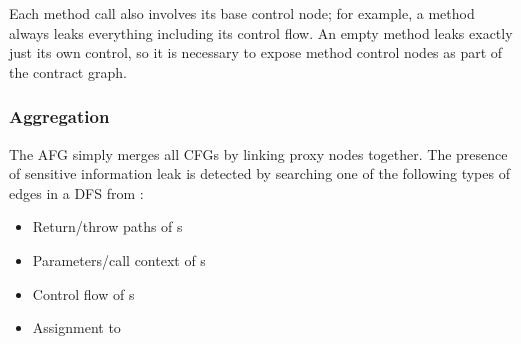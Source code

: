 Each method call also involves its base control node;
for example, a  method always leaks everything including its control flow.
An empty  method leaks exactly just its own control,
so it is necessary to expose method control nodes as part of the contract graph.

\subsubsection{Aggregation}
The \ac{AFG} simply merges all \ac{CFG}s by linking proxy nodes together.
The presence of sensitive information leak is detected
by searching one of the following types of edges
in a \ac{DFS} from :
\begin{itemize}
  \item Return/throw paths of s
  \item Parameters/call context of s
  \item Control flow of s
  \item Assignment to 
\end{itemize}
